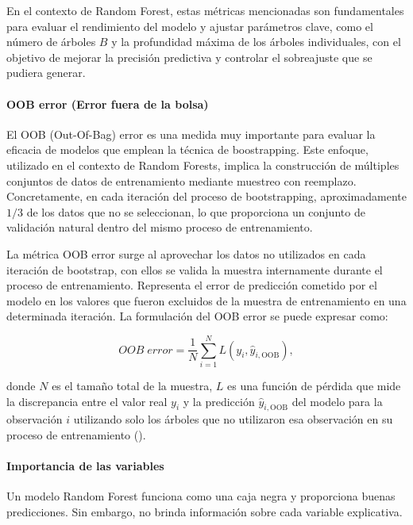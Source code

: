 En el contexto de Random Forest, estas métricas mencionadas son fundamentales para evaluar el rendimiento del modelo y ajustar parámetros clave, como el número de árboles \(B\) y la profundidad máxima de los árboles individuales, con el objetivo de mejorar la precisión predictiva y controlar el sobreajuste que se pudiera generar.



\paragraph{OOB error (Error fuera de la bolsa)}\label{sec:oob}

El OOB (Out-Of-Bag) error es una medida muy importante para evaluar la eficacia de modelos que emplean la técnica de boostrapping. Este enfoque,  utilizado en el contexto de Random Forests, implica la construcción de múltiples conjuntos de datos de entrenamiento mediante muestreo con reemplazo. Concretamente, en cada iteración del proceso de bootstrapping, aproximadamente \(1/3\) de los datos que no se seleccionan, lo que proporciona un conjunto de validación natural dentro del mismo proceso de entrenamiento. 

La métrica OOB error surge al aprovechar los datos no utilizados en cada iteración de bootstrap, con ellos se valida la muestra internamente durante el proceso de entrenamiento. Representa el error de predicción cometido por el modelo en los valores que fueron excluidos de la muestra de entrenamiento en una determinada iteración. La formulación del OOB error se puede expresar como:

\[
OOB\; error = \frac{1}{N} \sum_{i=1}^{N} L(y_i, \hat{y}_{i,\text{OOB}})
,\]

donde \(N\) es el tamaño total de la muestra, \(L\) es una función de pérdida que mide la discrepancia entre el valor real \(y_i\) y la predicción \(\hat{y}_{i,\text{OOB}}\) del modelo para la observación \(i\) utilizando solo los árboles que no utilizaron esa observación en su proceso de entrenamiento (\cite{james2013introduction}).


\paragraph{Importancia de las variables}\label{sec:importancia-variables}

Un modelo Random Forest funciona como una caja negra y proporciona buenas predicciones. Sin embargo, no brinda información sobre cada variable explicativa.

